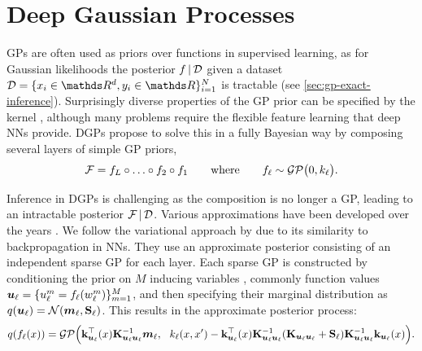 
\section{Deep Gaussian Processes}
\label{section:dgps}

GPs are often used as priors over functions in supervised learning, as for Gaussian likelihoods the posterior $f \,|\, \mathcal{D}$ given a dataset $\mathcal D = \{x_i \in \Reals^d, y_i \in \Reals\}_{i=1}^N$ is tractable (see \cref{sec:gp-exact-inference}). Surprisingly diverse properties of the GP prior can be specified by the kernel \citep{rasmussen2006,duvenaud2013structure,wilson2013gaussian,ginsbourger2013kernels,vanderwilk2018invariances}, although many problems require the flexible feature learning that deep NNs provide. DGPs \citep{Damianou2013} propose to solve this in a fully Bayesian way by composing several layers of simple GP priors,
\begin{equation}
    \mathcal{F} = f_L \circ \ldots \circ f_2 \circ f_1\qquad\text{where}\qquad
        f_\ell \sim \mathcal{GP}\big(0, k_\ell\big).
\end{equation}

Inference in DGPs is challenging as the composition is no longer a GP, leading to an intractable posterior $\mathcal{F} \,|\, \mathcal{D}$.  Various approximations have been developed over the years \citep{Damianou2013,hensman2014nested,bui2019dgpep,havasi2018inference}. We follow the variational approach by \citet{salimbeni2017doubly} due to its similarity to backpropagation in NNs. They use an approximate posterior consisting of an independent sparse GP for each layer. Each sparse GP is constructed by conditioning the prior on $M$ inducing variables \citep{titsias2009,hensman2013,matthews16}, commonly function values $\bm{u}_\ell = \{u^m_\ell = f_\ell(w_\ell^m)\}_{m=1}^M$, and then specifying their marginal distribution as $q(\vu_\ell) = \NormDist{\vm_\ell, \MS_\ell}$. This results in the approximate posterior process:
\begin{equation}
\label{eq:qf-dgp}
     q(f_\ell(x)) = \GP\Big(\kul^\top(x) \Kulul^{-1}\vm_\ell,\ \ k_\ell(x, x') -  \kul^\top(x) \Kulul^{-1} (\Kulul + \MS_\ell)\Kulul^{-1} \kul(x)\Big).
\end{equation}
%

